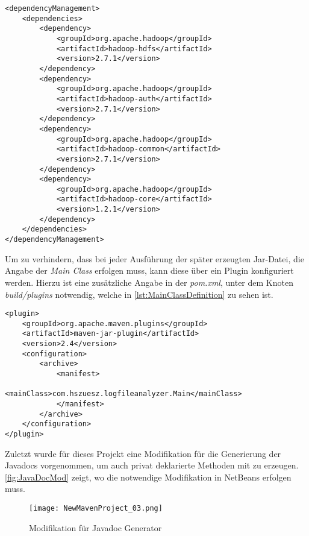 \begin{lstlisting}[caption=Auszug aus der \textit{pom.xml},label=lst:PomXML]
<dependencyManagement>
	<dependencies>
		<dependency>
			<groupId>org.apache.hadoop</groupId>
			<artifactId>hadoop-hdfs</artifactId>
			<version>2.7.1</version>
		</dependency>
		<dependency>
			<groupId>org.apache.hadoop</groupId>
			<artifactId>hadoop-auth</artifactId>
			<version>2.7.1</version>
		</dependency>
		<dependency>
			<groupId>org.apache.hadoop</groupId>
			<artifactId>hadoop-common</artifactId>
			<version>2.7.1</version>
		</dependency>
		<dependency>
			<groupId>org.apache.hadoop</groupId>
			<artifactId>hadoop-core</artifactId>
			<version>1.2.1</version>
		</dependency>
	</dependencies>
</dependencyManagement>
\end{lstlisting}

Um zu verhindern, dass bei jeder Ausführung der später erzeugten Jar-Datei, die Angabe der \textit{Main Class} erfolgen muss, kann diese über ein \gls{Plugin} konfiguriert werden. Hierzu ist eine zusätzliche Angabe in der \textit{pom.xml}, unter dem Knoten \textit{build/plugins} notwendig, welche in \autoref{lst:MainClassDefinition} zu sehen ist. \\

\pagebreak
\begin{lstlisting}[caption=Definition der \textit{Main Class} des Projektes,label=lst:MainClassDefinition]
<plugin>
	<groupId>org.apache.maven.plugins</groupId>
	<artifactId>maven-jar-plugin</artifactId>
	<version>2.4</version>
	<configuration>
		<archive>
			<manifest>
				<mainClass>com.hszuesz.logfileanalyzer.Main</mainClass>
			</manifest>
		</archive>
	</configuration>
</plugin>
\end{lstlisting}

Zuletzt wurde für dieses Projekt eine Modifikation für die Generierung der Javadocs vorgenommen, um auch privat deklarierte Methoden mit zu erzeugen. \autoref{fig:JavaDocMod} zeigt, wo die notwendige Modifikation in \gls{NetBeans} erfolgen muss.

\begin{figure}[h]
	\texttt{[image: NewMavenProject\_03.png]}
	\caption{Modifikation für Javadoc Generator}
	\label{fig:JavaDocMod}
\end{figure}

